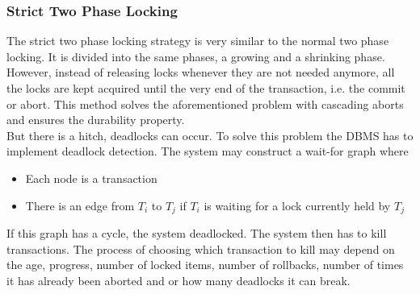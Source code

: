 \subsubsection{Strict Two Phase Locking}
The strict two phase locking strategy is very similar to the normal two phase locking. It is divided into the same phases, a growing and a shrinking phase. However, instead of releasing locks whenever they are not needed anymore, all the locks are kept acquired until the very end of the transaction, i.e. the commit or abort. This method solves the aforementioned problem with cascading aborts and ensures the durability property.\\
But there is a hitch, deadlocks can occur. To solve this problem the DBMS has to implement deadlock detection. The system may construct a wait-for graph where
\begin{itemize}
\item Each node is a transaction
\item There is an edge from $T_i$ to $T_j$ if $T_i$ is waiting for a lock currently held by $T_j$
\end{itemize}
If this graph has a cycle, the system deadlocked. The system then has to kill transactions. The process of choosing which transaction to kill may depend on the age, progress, number of locked items, number of rollbacks, number of times it has already been aborted and or how many deadlocks it can break.

